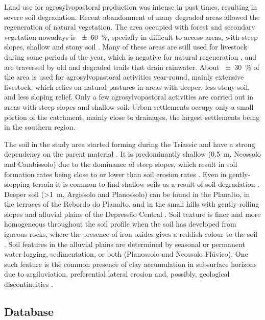 Land use for agrosylvopastoral production was intense in past times, resulting in severe soil
degradation. Recent abandonment of many degraded areas allowed the regeneration of natural
vegetation. The area occupied with forest and secondary vegetation nowadays is \SI{\pm60}{\percent},
specially in difficult to access areas, with steep slopes, shallow and stony soil
\cite{SamuelRosaEtAl2011a}. Many of these areas are still used for livestock during some periods of
the year, which is negative for natural regeneration \cite{ScheneiderEtAl1978,HackEtAl2005}, and
are traversed by old and degraded trails that drain rainwater. About \SI{\pm30}{\percent} of the
area is used for agrosylvopastoral activities year-round, mainly extensive livestock, which relies
on natural pastures in areas with deeper, less stony soil, and less sloping relief. Only a few
agrosylvopastoral activities are carried out in areas with steep slopes and shallow soil. Urban
settlements occupy only a small portion of the catchment, mainly close to drainages, the largest
settlements being in the southern region.

The soil in the study area started forming during the Triassic and have a strong dependency on the
parent material \cite{NascimentoEtAl2010}. It is predominantly shallow (\SI{0.5}{\metre}, Neossolo
and Cambissolo) due to the dominance of steep slopes, which result in soil formation rates being
close to or lower than soil erosion rates \cite{DalmolinEtAl2006a}. Even in gently-slopping terrain
it is common to find shallow soils as a result of soil degradation \cite{Moser1990, MouraBueno2012}.
Deeper soil (\SI{>1}{\metre}, Argissolo and Planossolo) can be found in the Planalto, in the
terraces of the Rebordo do Planalto, and in the small hills with gently-rolling slopes and alluvial
plains of the Depressão Central \cite{Moser1990,MiguelEtAl2012}. Soil texture is finer and more
homogeneous throughout the soil profile when the soil has developed from igneous rocks, where the
presence of iron oxides gives a reddish colour to the soil \cite{MiguelEtAl2012}. Soil features in
the alluvial plains are determined by seasonal or permanent water-logging, sedimentation, or both
(Planossolo and Neossolo Flúvico). One such feature is the common presence of clay accumulation in
subsurface horizons due to argiluviation, preferential lateral erosion and, possibly, geological
discontinuities \cite{PieriniEtAl2002,MiguelEtAl2012}.

\subsection{Database}
\label{sec:intro-database}

